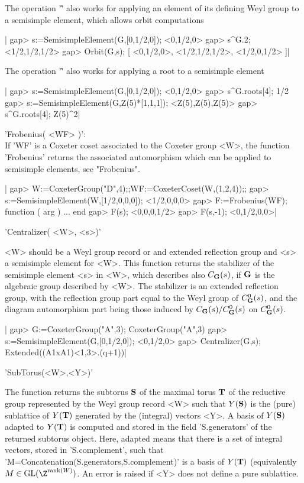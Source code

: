 The operation '\^' also works for applying an element of its defining Weyl
group to a semisimple element, which allows orbit computations\:

|    gap> s:=SemisimpleElement(G,[0,1/2,0]);
    <0,1/2,0>
    gap> s^G.2;
    <1/2,1/2,1/2>
    gap> Orbit(G,s);
    [ <0,1/2,0>, <1/2,1/2,1/2>, <1/2,0,1/2> ]|

The operation '\^' also works for applying a root to a semisimple element\:

|    gap> s:=SemisimpleElement(G,[0,1/2,0]);
    <0,1/2,0>
    gap> s^G.roots[4];
    1/2
    gap> s:=SemisimpleElement(G,Z(5)*[1,1,1]);
    <Z(5),Z(5),Z(5)>
    gap> s^G.roots[4];
    Z(5)^2|

'Frobenius(  <WF> )':\\ If  'WF' is a  Coxeter coset associated to the
Coxeter   group  <W>,  the  function  'Frobenius'  returns  the  associated
automorphism which can be applied to semisimple elements, see "Frobenius".

|    gap> W:=CoxeterGroup("D",4);;WF:=CoxeterCoset(W,(1,2,4));;
    gap> s:=SemisimpleElement(W,[1/2,0,0,0]);
    <1/2,0,0,0>
    gap> F:=Frobenius(WF);
    function ( arg ) ... end
    gap> F(s);
    <0,0,0,1/2>
    gap> F(s,-1);
    <0,1/2,0,0>|


'Centralizer( <W>, <s>)'

<W>  should be a Weyl group record or and extended reflection group and <s>
a  semisimple element for <W>. This  function returns the stabilizer of the
semisimple element <s> in <W>, which describes also $C_{\mathbf G}(s)$, if ${\mathbf G}$ is
the  algebraic  group  described  by  <W>.  The  stabilizer  is an extended
reflection group, with the reflection group part equal to the Weyl group of
$C_{\mathbf G}^0(s)$,  and  the  diagram  automorphism  part being those induced by
$C_{\mathbf G}(s)/C_{\mathbf G}^0(s)$ on $C_{\mathbf G}^0(s)$.

|    gap> G:=CoxeterGroup("A",3);
    CoxeterGroup("A",3)
    gap> s:=SemisimpleElement(G,[0,1/2,0]);
    <0,1/2,0>
    gap> Centralizer(G,s);
    Extended((A1xA1)<1,3>.(q+1))|


'SubTorus(<W>,<Y>)'

The  function returns the subtorus ${\mathbf S}$ of  the maximal torus ${\mathbf T}$ of the
reductive group represented by the Weyl group record <W> such that $Y({\mathbf S})$
is  the (pure) sublattice  of $Y({\mathbf T})$ generated  by the (integral) vectors
<Y>.  A basis of $Y({\mathbf S})$ adapted to $Y({\mathbf T})$ is computed and stored in the
field  'S.generators' of the returned  subtorus object. Here, adapted means
that  there is  a set  of integral  vectors, stored in 'S.complement', such
that  'M\:=Concatenation(S.generators,S.complement)' is a basis of $Y({\mathbf T})$
(equivalently  $M\in\text{GL}(\Z^{\text{rank}(W)})$. An error  is raised if
<Y> does not define a pure sublattice.

